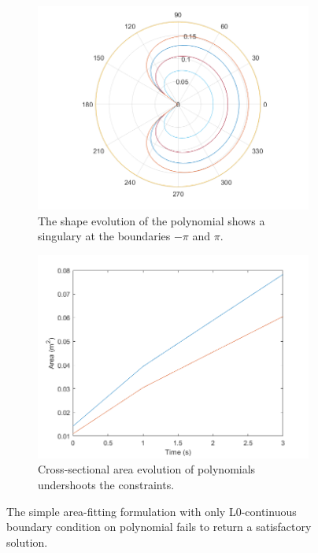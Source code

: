 \begin{figure}
    \begin{subfigure}{0.48\textwidth}
        \includegraphics[width = 0.9\linewidth]{figures/sampleSol.png}
    \caption{The shape evolution of the polynomial shows a singulary at the boundaries $-\pi$ and $\pi$.}
        \label{fig:sampleSol}
    \end{subfigure}
    \begin{subfigure}{0.48\textwidth}
        \includegraphics[width = 0.9\linewidth]{figures/sampleA.png}
        \caption{Cross-sectional area evolution of polynomials undershoots the constraints.}
        \label{fig:sampleA}
    \end{subfigure}
    \caption{The simple area-fitting formulation with only L0-continuous boundary condition
    on polynomial fails to return a satisfactory solution.}
    \label{fig:sampleSolandA}
\end{figure}

